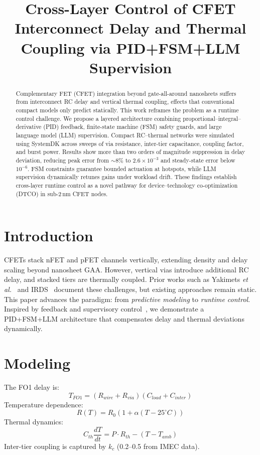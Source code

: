 \documentclass[conference]{IEEEtran}
\title{Cross-Layer Control of CFET Interconnect Delay and Thermal Coupling via PID+FSM+LLM Supervision}
\author{
\IEEEauthorblockN{Shinichi Samizo}
\IEEEauthorblockA{Independent Semiconductor Researcher\\
Project Design Hub, Samizo-AITL\\
\textit{Email:} \href{mailto:shin3t72@gmail.com}{shin3t72@gmail.com}\quad
\textit{GitHub:} \href{https://github.com/Samizo-AITL}{Samizo-AITL}}
}
\begin{document}
\maketitle

\begin{abstract}
Complementary FET (CFET) integration beyond gate-all-around nanosheets suffers from interconnect RC delay and vertical thermal coupling, effects that conventional compact models only predict statically. This work reframes the problem as a runtime control challenge. We propose a layered architecture combining proportional--integral--derivative (PID) feedback, finite-state machine (FSM) safety guards, and large language model (LLM) supervision. Compact RC--thermal networks were simulated using SystemDK across sweeps of via resistance, inter-tier capacitance, coupling factor, and burst power. Results show more than two orders of magnitude suppression in delay deviation, reducing peak error from $\sim$8\% to $2.6\times 10^{-3}$ and steady-state error below $10^{-6}$. FSM constraints guarantee bounded actuation at hotspots, while LLM supervision dynamically retunes gains under workload drift. These findings establish cross-layer runtime control as a novel pathway for device--technology co-optimization (DTCO) in sub-2\,nm CFET nodes.
\end{abstract}

\section{Introduction}
CFETs stack nFET and pFET channels vertically, extending density and delay scaling beyond nanosheet GAA. However, vertical vias introduce additional RC delay, and stacked tiers are thermally coupled. Prior works such as Yakimets \textit{et al.}~\cite{yakimets2020cfet} and IRDS~\cite{irds2023} document these challenges, but existing approaches remain static. This paper advances the paradigm: from \emph{predictive modeling} to \emph{runtime control}. Inspired by feedback and supervisory control~\cite{franklin2015feedback,khalil2002nonlinear,anderson2007optimal}, we demonstrate a PID+FSM+LLM architecture that compensates delay and thermal deviations dynamically.

\section{Modeling}
The FO1 delay is:
\begin{equation}
T_{FO1} = (R_{wire}+R_{via})(C_{load}+C_{inter})
\end{equation}
Temperature dependence:
\begin{equation}
R(T) = R_0 \left(1 + \alpha (T-25^\circ C)\right)
\end{equation}
Thermal dynamics:
\begin{equation}
C_{th}\frac{dT}{dt} = P\cdot R_{th} - (T - T_{amb})
\end{equation}
Inter-tier coupling is captured by $k_c$ (0.2--0.5 from IMEC data).
\end{document}

